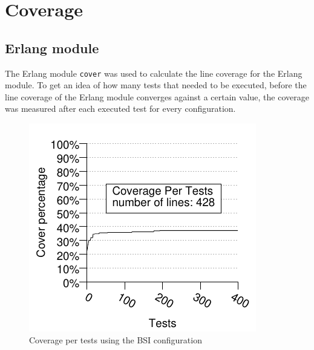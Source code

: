 \section{Coverage}
\label{SEC:COVERAGE}
\subsection{Erlang module}
\newcommand{\linecoverage}{97.38\%}
\newcommand{\bullseyecoverage}{81\%}
The Erlang module \lstinline!cover! was used to calculate the line
coverage for the Erlang module. To get an idea of how many tests that
needed to be executed, before the line coverage of the Erlang module
converges against a certain value, the coverage was measured after
each executed test for every configuration.

\begin{figure}[!ht]
\begin{center}
\includegraphics{generated_pictures/coverage_per_tests_bsi.pdf}
\end{center}
\caption{Coverage per tests using the BSI configuration}
\label{FIG:COV_PER_TESTS_BSI}
\end{figure}

